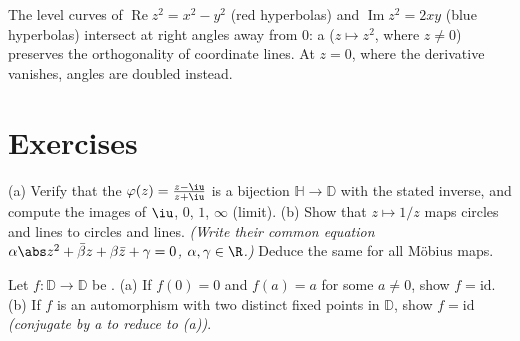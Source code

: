 \begin{omfigure}

{\small The level curves of $\operatorname{Re}z^2 = x^2 - y^2$
(red hyperbolas) and $\operatorname{Im}z^2 = 2xy$ (blue
hyperbolas) intersect at right angles away from $0$: a
 ($z \mapsto z^2$, where $z \neq 0$) preserves
the orthogonality of coordinate lines. At $z = 0$, where the
derivative vanishes, angles are doubled instead.}
\end{omfigure}

\section{Exercises}

\begin{exercise}[$\star$]\label{exo:b3:conformal:1}
(a) Verify that the  $\varphi(z) = \frac{z -
\iu}{z + \iu}$ is a bijection $\mathbb H \to \mathbb D$ with
the stated inverse, and compute the images of $\iu$, $0$,
$1$, $\infty$ (limit).
(b) Show that $z \mapsto 1/z$ maps circles and lines to
circles and lines. \emph{(Write their common equation
$\alpha\abs z^2 + \bar\beta z + \beta\bar z + \gamma = 0$,
$\alpha, \gamma \in \R$.)} Deduce the same for all M\"obius
maps.
\end{exercise}

\begin{exercise}[$\star$]\label{exo:b3:conformal:2}
Let $f \colon \mathbb D \to \mathbb D$ be .
(a) If $f(0) = 0$ and $f(a) = a$ for some $a \neq 0$, show $f
= \mathrm{id}$.
(b) If $f$ is an automorphism with two distinct fixed points
in $\mathbb D$, show $f = \mathrm{id}$
\emph{(conjugate by a  to reduce to (a))}.
\end{exercise}

